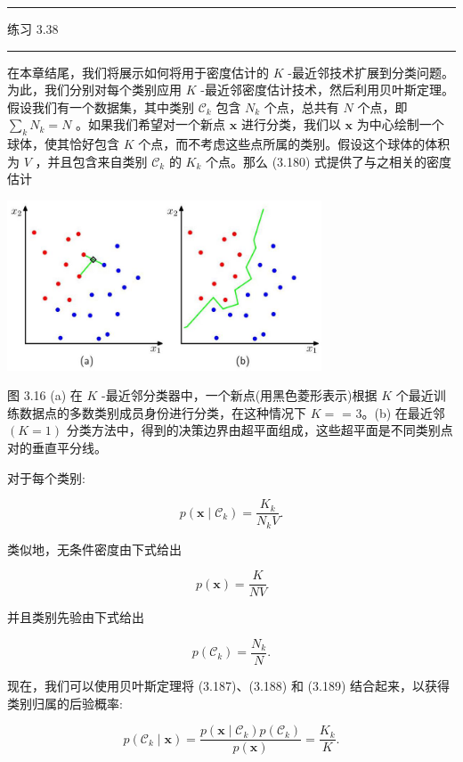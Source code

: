 \documentclass[10pt]{article}
\newcommand{\HRule}{\begin{center}\rule{0.9\linewidth}{0.2mm}\end{center}}
\begin{document}
\HRule

练习 3.38

\HRule

在本章结尾，我们将展示如何将用于密度估计的 \(K\) -最近邻技术扩展到分类问题。为此，我们分别对每个类别应用 \(K\) -最近邻密度估计技术，然后利用贝叶斯定理。假设我们有一个数据集，其中类别 \({\mathcal{C}}_{k}\) 包含 \({N}_{k}\) 个点，总共有 \(N\) 个点，即 \(\mathop{\sum }\limits_{k}{N}_{k} = N\) 。如果我们希望对一个新点 \(\mathbf{x}\) 进行分类，我们以 \(\mathbf{x}\) 为中心绘制一个球体，使其恰好包含 \(K\) 个点，而不考虑这些点所属的类别。假设这个球体的体积为 \(V\) ，并且包含来自类别 \({\mathcal{C}}_{k}\) 的 \({K}_{k}\) 个点。那么 (3.180) 式提供了与之相关的密度估计

\begin{center}
\includegraphics[max width=0.7\textwidth]{images/0194e279-9b28-703a-88f4-c3ac21e2010d_123_654_342_888_480_0.jpg}
\end{center}
\hspace*{3em} 

图 3.16 (a) 在 \(K\) -最近邻分类器中，一个新点(用黑色菱形表示)根据 \(K\) 个最近训练数据点的多数类别成员身份进行分类，在这种情况下 \(K =\) = 3。(b) 在最近邻 \(\left( {K = 1}\right)\) 分类方法中，得到的决策边界由超平面组成，这些超平面是不同类别点对的垂直平分线。

对于每个类别:

\[
p\left( {\mathbf{x} \mid  {\mathcal{C}}_{k}}\right)  = \frac{{K}_{k}}{{N}_{k}V}. \tag{3.187}
\]

类似地，无条件密度由下式给出

\[
p\left( \mathbf{x}\right)  = \frac{K}{NV} \tag{3.188}
\]

并且类别先验由下式给出

\[
p\left( {\mathcal{C}}_{k}\right)  = \frac{{N}_{k}}{N}. \tag{3.189}
\]

现在，我们可以使用贝叶斯定理将 (3.187)、(3.188) 和 (3.189) 结合起来，以获得类别归属的后验概率:

\[
p\left( {{\mathcal{C}}_{k} \mid  \mathbf{x}}\right)  = \frac{p\left( {\mathbf{x} \mid  {\mathcal{C}}_{k}}\right) p\left( {\mathcal{C}}_{k}\right) }{p\left( \mathbf{x}\right) } = \frac{{K}_{k}}{K}. \tag{3.190}
\]
\end{document}
